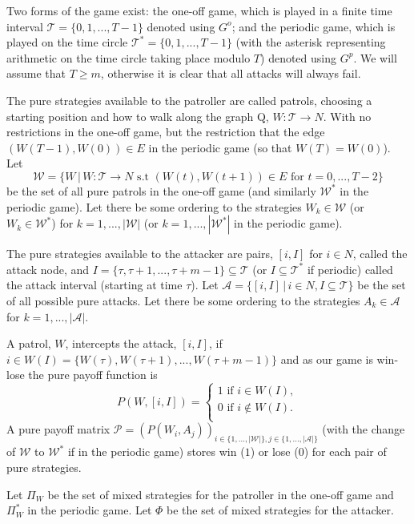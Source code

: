 \documentclass[a4paper,10pt]{article}
\theoremstyle{definition}
\theoremstyle{definition}
\theoremstyle{remark}
\theoremstyle{definition}
\begin{document}
Two forms of the game exist: the one-off game, which is played in a finite time interval $\mathcal{T}=\{0,1,...,T-1\}$ denoted using $G^{o}$; and the periodic game, which is played on the time circle $\mathcal{T}^*=\{0,1,...,T-1\}$ (with the asterisk representing arithmetic on the time circle taking place modulo $T$) denoted using $G^p$. We will assume that $T \geq m$, otherwise it is clear that all attacks will always fail.

The pure strategies available to the patroller are called patrols, choosing a starting position and how to walk along the graph Q, $W:\mathcal{T} \rightarrow N$. With no restrictions in the one-off game, but the restriction that the edge $(W(T-1),W(0)) \in E$ in the periodic game (so that $W(T)=W(0)$). Let $$\mathcal{W}=\{ W \, | \, W:\mathcal{T} \rightarrow N \text{ s.t } (W(t),W(t+1)) \in E \text{ for } t=0,...,T-2  \} $$ be the set of all pure patrols in the one-off game (and similarly $\mathcal{W}^*$ in the periodic game). Let there be some ordering to the strategies $W_{k} \in \mathcal{W}$ (or $W_{k} \in \mathcal{W}^{*}$) for $k=1,...,|\mathcal{W}|$ (or $k=1,...,|\mathcal{W}^*|$ in the periodic game).

The pure strategies available to the attacker are pairs, $[i,I]$ for $i \in N$, called the attack node, and $I=\{ \tau,\tau+1,...,\tau+m-1 \} \subseteq \mathcal{T}$ (or $I \subseteq \mathcal{T}^*$ if periodic) called the attack interval (starting at time $\tau$). Let $\mathcal{A}=\{[i,I] \, | \, i \in N , I \subseteq \mathcal{T} \}$ be the set of all possible pure attacks. Let there be some ordering to the strategies $A_{k} \in \mathcal{A}$ for $k=1,...,|\mathcal{A}|$.

A patrol, $W$, intercepts the attack, $[i,I]$, if $i \in W(I)=\{W(\tau),W(\tau+1),...,W(\tau+m-1)\}$ and as our game is win-lose the pure payoff function is
$$P(W,[i,I])=\left\{ \begin{array}{l}
1 \text{  if  } i \in W(I) ,\\
0 \text{  if  } i \notin W(I) .\\
\end{array}\right.$$
A pure payoff matrix $\mathcal{P}=(P(W_{i},A_{j}))_{i \in \{ 1,...,|\mathcal{W}| \}, j \in \{ 1,...,|\mathcal{A}| \}}$ (with the change of $\mathcal{W}$ to $\mathcal{W}^*$ if in the periodic game) stores win ($1$) or lose ($0$) for each pair of pure strategies.

Let $\Pi_{W}$ be the set of mixed strategies for the patroller in the one-off game and $\Pi_{W}^*$ in the periodic game. Let $\Phi$ be the set of mixed strategies for the attacker.
\end{document}
